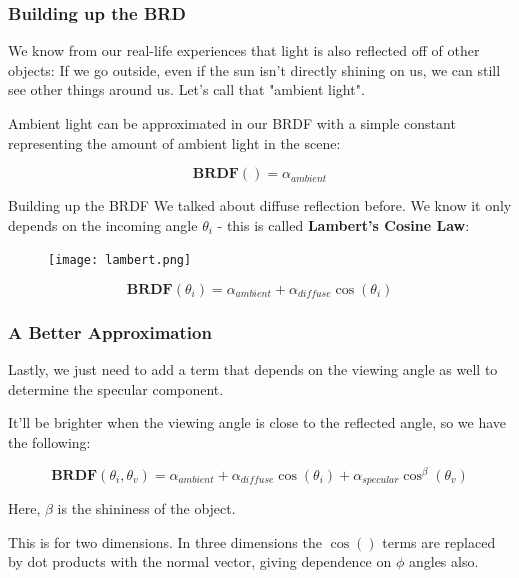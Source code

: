 \documentclass[12pt]{beamer}
\begin{document}
  \begin{frame}
    \frametitle{Building up the BRD} %

    We know from our real-life experiences that light is also reflected off of other objects: If we go outside, even if the sun isn't directly shining on us, we can still see other things around us.
    Let's call that "ambient light".

    \hfill

    Ambient light can be approximated in our BRDF with a simple constant representing the amount of ambient light in the scene:

    $$\boldsymbol{B R D F}() = \alpha_{ambient}$$

  \end{frame}

  \begin{frame}{Building up the BRDF}
    We talked about diffuse reflection before. We know it only depends on the incoming angle $\theta_i$ - this is called \textbf{Lambert's Cosine Law}:
    \begin{figure}
      \centering
      \texttt{[image: lambert.png]}
    \end{figure}

    $$\boldsymbol{B R D F}\left(\theta_i \right) = \alpha_{ambient} + \alpha_{diffuse} \cos(\theta_i)$$

  \end{frame}

  \begin{frame}
    \frametitle{A Better Approximation}

    Lastly, we just need to add a term that depends on the viewing angle as well to determine the specular component.

    \hfill

    It'll be brighter when the viewing angle is close to the reflected angle, so we have the following:

    $$\boldsymbol{B R D F}\left(\theta_i, \theta_v \right) = \alpha_{ambient} + \alpha_{diffuse} \cos(\theta_i) + \alpha_{specular} \cos^{\beta}(\theta_v)$$

    Here, $\beta$ is the shininess of the object.

    \hfill

    This is for two dimensions. In three dimensions the $\cos()$ terms are replaced by dot products with the normal vector, giving dependence on $\phi$ angles also.

  \end{frame}
\end{document}
